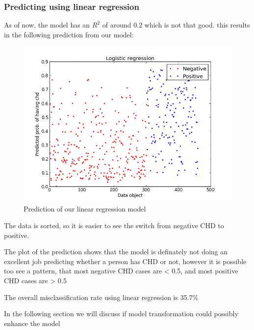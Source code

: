 \subsubsection{Predicting using linear regression}
As of now, the model has an $R^{2}$ of around 0.2 which is not that good. this results in the following prediction from our model:
\begin{figure}[H]
\centering
\includegraphics[width=12cm, keepaspectratio=true]{pictures/linearPrediction.png}
\caption{Prediction of our linear regression model}
\label{linearPrediction}
\end{figure}
The data is sorted, so it is easier to see the switch from negative CHD to positive.

The plot of the prediction shows that the model is definately not doing an excellent job predicting whether a person has CHD or not, however it is possible too see a pattern, that most negative CHD cases are < 0.5, and most positive CHD cases are > 0.5

The overall misclassification rate using linear regression is 35.7\%

In the following section we will discuss if model transformation could possibly enhance the model
